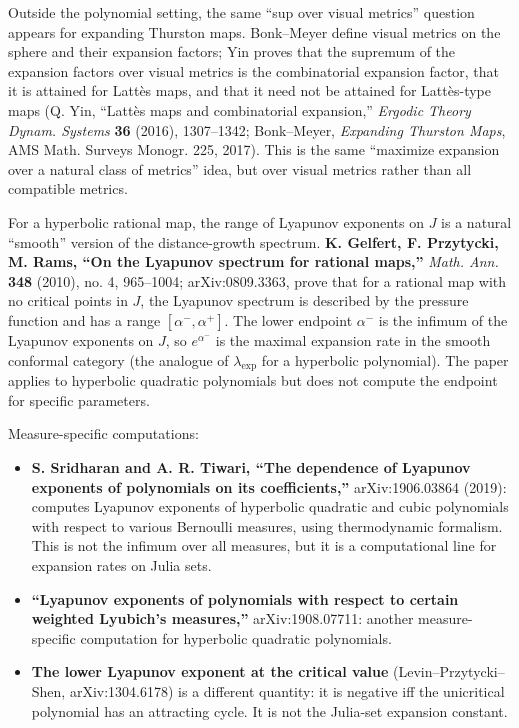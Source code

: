 \documentclass[
]{article}
\providecommand{\tightlist}{%
  \setlength{\itemsep}{0pt}\setlength{\parskip}{0pt}}
\begin{document}
Outside the polynomial setting, the same ``sup over visual metrics''
question appears for expanding Thurston maps. Bonk--Meyer define visual
metrics on the sphere and their expansion factors; Yin proves that the
supremum of the expansion factors over visual metrics is the
combinatorial expansion factor, that it is attained for Latt\`{e}s maps,
and that it need not be attained for Latt\`{e}s-type maps (Q. Yin,
``Latt\`{e}s maps and combinatorial expansion,'' \emph{Ergodic Theory
Dynam. Systems} \textbf{36} (2016), 1307--1342; Bonk--Meyer,
\emph{Expanding Thurston Maps}, AMS Math. Surveys Monogr. 225, 2017).
This is the same ``maximize expansion over a natural class of metrics''
idea, but over visual metrics rather than all compatible metrics.

For a hyperbolic rational map, the range of Lyapunov exponents on \(J\)
is a natural ``smooth'' version of the distance-growth spectrum.
\textbf{K. Gelfert, F. Przytycki, M. Rams, ``On the Lyapunov spectrum
for rational maps,''} \emph{Math. Ann.} \textbf{348} (2010), no. 4,
965--1004; arXiv:0809.3363, prove that for a rational map with no
critical points in \(J\), the Lyapunov spectrum is described by the
pressure function and has a range \([\alpha^-,\alpha^+]\). The lower
endpoint \(\alpha^-\) is the infimum of the Lyapunov exponents on \(J\),
so \(e^{\alpha^-}\) is the maximal expansion rate in the smooth
conformal category (the analogue of \(\lambda_{\exp}\) for a hyperbolic
polynomial). The paper applies to hyperbolic quadratic polynomials but
does not compute the endpoint for specific parameters.

Measure-specific computations:

\begin{itemize}
\tightlist
\item
  \textbf{S. Sridharan and A. R. Tiwari, ``The dependence of Lyapunov
  exponents of polynomials on its coefficients,''} arXiv:1906.03864
  (2019): computes Lyapunov exponents of hyperbolic quadratic and cubic
  polynomials with respect to various Bernoulli measures, using
  thermodynamic formalism. This is not the infimum over all measures,
  but it is a computational line for expansion rates on Julia sets.
\item
  \textbf{``Lyapunov exponents of polynomials with respect to certain
  weighted Lyubich's measures,''} arXiv:1908.07711: another
  measure-specific computation for hyperbolic quadratic polynomials.
\item
  \textbf{The lower Lyapunov exponent at the critical value}
  (Levin--Przytycki--Shen, arXiv:1304.6178) is a different quantity: it
  is negative iff the unicritical polynomial has an attracting cycle. It
  is not the Julia-set expansion constant.
\end{itemize}
\end{document}
